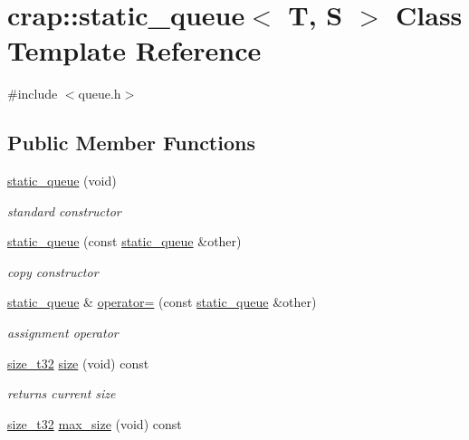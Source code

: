 \hypertarget{classcrap_1_1static__queue}{\section{crap\-:\-:static\-\_\-queue$<$ T, S $>$ Class Template Reference}
\label{classcrap_1_1static__queue}
}


{\ttfamily \#include $<$queue.\-h$>$}

\subsection*{Public Member Functions}
\begin{DoxyCompactItemize}
\item 
\hyperlink{classcrap_1_1static__queue_a56899e95cb665eaea2fd4c7406cf31cd}{static\-\_\-queue} (void)
\begin{DoxyCompactList}\small\item\em standard constructor \end{DoxyCompactList}\item 
\hyperlink{classcrap_1_1static__queue_a2b2805029cee873b2469df1a4e99f0e5}{static\-\_\-queue} (const \hyperlink{classcrap_1_1static__queue}{static\-\_\-queue} \&other)
\begin{DoxyCompactList}\small\item\em copy constructor \end{DoxyCompactList}\item 
\hyperlink{classcrap_1_1static__queue}{static\-\_\-queue} \& \hyperlink{classcrap_1_1static__queue_a9f8cb25f63d307c44bd6feb2b1bf0d07}{operator=} (const \hyperlink{classcrap_1_1static__queue}{static\-\_\-queue} \&other)
\begin{DoxyCompactList}\small\item\em assignment operator \end{DoxyCompactList}\item 
\hyperlink{types_8h_a38c0a12279ffe0fabec44939e753c914}{size\-\_\-t32} \hyperlink{classcrap_1_1static__queue_ace84c28c7da616fd026117ecb0f489f1}{size} (void) const 
\begin{DoxyCompactList}\small\item\em returns current size \end{DoxyCompactList}\item 
\hyperlink{types_8h_a38c0a12279ffe0fabec44939e753c914}{size\-\_\-t32} \hyperlink{classcrap_1_1static__queue_abf66912fb090ccd0253416b97423bac8}{max\-\_\-size} (void) const 

\end{DoxyCompactItemize}
